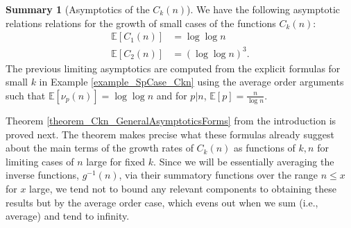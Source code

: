 \documentclass[11pt,reqno,a4letter]{article}
\numberwithin{figure}{section}
\numberwithin{table}{section}
\theoremstyle{plain}
\numberwithin{theorem}{section}
\theoremstyle{definition}
\newtheorem{summary}[theorem]{Summary}
\begin{document}
\begin{summary}[Asymptotics of the $C_k(n)$]
We have the following asymptotic relations relations for the growth of small cases of 
the functions $C_k(n)$: 
\begin{align*} 
\mathbb{E}[C_1(n)] & = \log\log n \\ 
\mathbb{E}[C_2(n)] & = (\log\log n)^3. 
\end{align*} 
The previous limiting asymptotics are computed from the explicit formulas for small $k$ in 
Example \ref{example_SpCase_Ckn} using the average order arguments such that 
$\mathbb{E}[\nu_p(n)] = \log\log n$ and for $p|n$, $\mathbb{E}[p] = \frac{n}{\log n}$. 

Theorem \ref{theorem_Ckn_GeneralAsymptoticsForms} from the introduction is proved next. 
The theorem makes precise what these formulas already 
suggest about the main terms of the growth rates of 
$C_k(n)$ as functions of $k,n$ for limiting cases of $n$ large for fixed $k$. 
Since we will be essentially averaging the inverse functions, $g^{-1}(n)$, via their summatory functions 
over the range $n \leq x$ for $x$ large, we tend not to bound any relevant components to obtaining 
these results but by the 
average order case, which evens out when we sum (i.e., average) and tend to infinity. 
\end{summary} 
\end{document}
